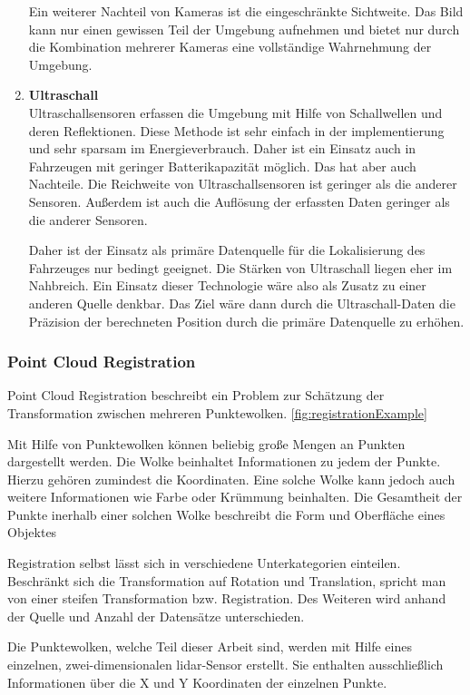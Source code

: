 \begin{enumerate}[leftmargin=*]
    Ein weiterer Nachteil von Kameras ist die eingeschränkte Sichtweite. 
    Das Bild kann nur einen gewissen Teil der Umgebung aufnehmen und bietet nur durch die Kombination mehrerer Kameras eine vollständige Wahrnehmung der Umgebung.

    \item \textbf{Ultraschall} \\
    Ultraschallsensoren erfassen die Umgebung mit Hilfe von Schallwellen und deren Reflektionen. 
    Diese Methode ist sehr einfach in der implementierung und sehr sparsam im Energieverbrauch. 
    Daher ist ein Einsatz auch in Fahrzeugen mit geringer Batterikapazität möglich.
    Das hat aber auch Nachteile. 
    Die Reichweite von Ultraschallsensoren ist geringer als die anderer Sensoren. 
    Außerdem ist auch die Auflösung der erfassten Daten geringer als die anderer Sensoren.

    Daher ist der Einsatz als primäre Datenquelle für die Lokalisierung des Fahrzeuges nur bedingt geeignet.
    Die Stärken von Ultraschall liegen eher im Nahbreich.
    Ein Einsatz dieser Technologie wäre also als Zusatz zu einer anderen Quelle denkbar. 
    Das Ziel wäre dann durch die Ultraschall-Daten die Präzision der berechneten Position durch die primäre Datenquelle zu erhöhen. 
\end{enumerate}

\subsubsection{Point Cloud Registration}
\label{pcl}
Point Cloud Registration beschreibt ein Problem zur Schätzung der Transformation zwischen mehreren Punktewolken. \ref{fig:registrationExample}

Mit Hilfe von Punktewolken können beliebig große Mengen an Punkten dargestellt werden.
Die Wolke beinhaltet Informationen zu jedem der Punkte.
Hierzu gehören zumindest die Koordinaten.
Eine solche Wolke kann jedoch auch weitere Informationen wie Farbe oder Krümmung beinhalten. 
Die Gesamtheit der Punkte inerhalb einer solchen Wolke beschreibt die Form und Oberfläche eines Objektes
\cite[chapters 2.2]{registration2021}

Registration selbst lässt sich in verschiedene Unterkategorien einteilen.
Beschränkt sich die Transformation auf Rotation und Translation, spricht man von einer steifen Transformation bzw. Registration.
Des Weiteren wird anhand der Quelle und Anzahl der Datensätze unterschieden.

Die Punktewolken, welche Teil dieser Arbeit sind, werden mit Hilfe eines einzelnen, zwei-dimensionalen \ac{lidar}-Sensor erstellt.
Sie enthalten ausschließlich Informationen über die X und Y Koordinaten der einzelnen Punkte.

